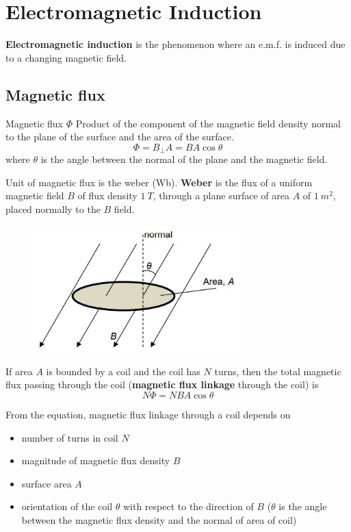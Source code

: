 \section{Electromagnetic Induction}
\textbf{Electromagnetic induction} is the phenomenon where an e.m.f. is induced due to a changing magnetic field.

\subsection{Magnetic flux}
\begin{defn}{Magnetic flux $\Phi$}{}
Product of the component of the magnetic field density normal to the plane of the surface and the area of the
surface.
\begin{equation}
\Phi = B_{\perp}A = BA\cos\theta
\end{equation}
where $\theta$ is the angle between the normal of the plane and the magnetic field.
\end{defn}

Unit of magnetic flux is the weber (Wb). \textbf{Weber} is the flux of a uniform magnetic field $B$ of flux density $1\:\unit{T}$, through a plane surface of area $A$ of $1\:\unit{m^2}$, placed normally to the $B$ field.

\begin{figure}[H]
    \centering
    \includegraphics[width=8cm]{images/magnetic_flux.jpg}
\end{figure}

If area $A$ is bounded by a coil and the coil has $N$ turns, then the total magnetic flux passing through the coil (\textbf{magnetic flux linkage} through the coil) is
\begin{equation}
N\Phi = NBA\cos\theta
\end{equation}

From the equation, magnetic flux linkage through a coil depends on
\begin{itemize}
\item number of turns in coil $N$
\item magnitude of magnetic flux density $B$
\item surface area $A$
\item orientation of the coil $\theta$ with respect to the direction of $B$ ($\theta$ is the angle between the magnetic flux density and the normal of area of coil)
\end{itemize}

